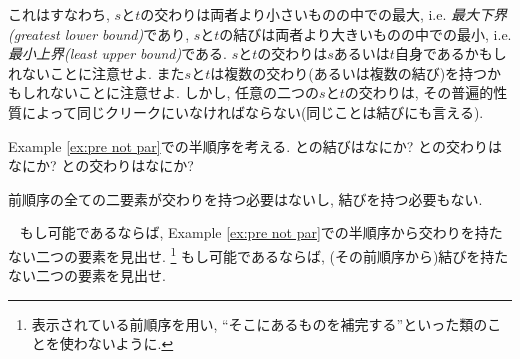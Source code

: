 
これはすなわち, $s$と$t$の交わりは両者より小さいものの中での最大, i.e. \emph{最大下界(greatest lower bound)}であり, $s$と$t$の結びは両者より大きいものの中での最小, i.e. \emph{最小上界(least upper bound)}である. $s$と$t$の交わりは$s$あるいは$t$自身であるかもしれないことに注意せよ. また$s$と$t$は複数の交わり(あるいは複数の結び)を持つかもしれないことに注意せよ. しかし, 任意の二つの$s$と$t$の交わりは, その普遍的性質によって同じクリークにいなければならない(同じことは結びにも言える).

\begin{exercise}
Example \ref{ex:pre not par}での半順序を考える.
\sexc {}との結びはなにか?
\next {}との交わりはなにか?
\next {}との交わりはなにか?
\endsexc
\end{exercise}

前順序の全ての二要素が交わりを持つ必要はないし, 結びを持つ必要もない.

\begin{exercise}\label{exc:not all meets and joins}~
\sexc もし可能であるならば, Example \ref{ex:pre not par}での半順序から交わりを持たない二つの要素を見出せ.
\footnote{表示されている前順序を用い, ``そこにあるものを補完する''といった類のことを使わないように.} 
\next もし可能であるならば, (その前順序から)結びを持たない二つの要素を見出せ.
\endsexc
\end{exercise}

